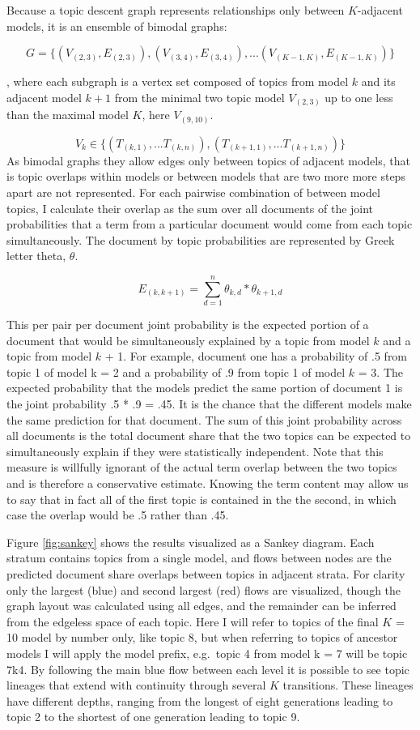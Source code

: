 \documentclass[]{book}
\theoremstyle{definition}
\theoremstyle{definition}
\theoremstyle{definition}
\theoremstyle{remark}
\begin{document}
Because a topic descent graph represents relationships only between
\(K\)-adjacent models, it is an ensemble of bimodal graphs:

\[G=\{(V_{(2,3)},E_{(2,3)}),(V_{(3,4)},E_{(3,4)}),...(V_{(K-1,K)},E_{(K-1,K)})\}\]

, where each subgraph is a vertex set composed of topics from model
\(k\) and its adjacent model \(k + 1\) from the minimal two topic model
\(V_{(2,3)}\) up to one less than the maximal model \(K\), here
\(V_{(9,10)}\).

\[V_k\in\{(T_{(k,1)},...T_{(k,n)}),(T_{(k+1,1)},...T_{(k+1,n)})\}\] As
bimodal graphs they allow edges only between topics of adjacent models,
that is topic overlaps within models or between models that are two more
more steps apart are not represented. For each pairwise combination of
between model topics, I calculate their overlap as the sum over all
documents of the joint probabilities that a term from a particular
document would come from each topic simultaneously. The document by
topic probabilities are represented by Greek letter theta, \(\theta\).

\[E_{(k,k+1)}={\sum^n_{d=1}\theta_{k,d}*\theta_{k+1,d}}\]

This per pair per document joint probability is the expected portion of
a document that would be simultaneously explained by a topic from model
\(k\) and a topic from model \(k\) + 1. For example, document one has a
probability of .5 from topic 1 of model k = 2 and a probability of .9
from topic 1 of model \(k\) = 3. The expected probability that the
models predict the same portion of document 1 is the joint probability
.5 * .9 = .45. It is the chance that the different models make the same
prediction for that document. The sum of this joint probability across
all documents is the total document share that the two topics can be
expected to simultaneously explain if they were statistically
independent. Note that this measure is willfully ignorant of the actual
term overlap between the two topics and is therefore a conservative
estimate. Knowing the term content may allow us to say that in fact all
of the first topic is contained in the the second, in which case the
overlap would be .5 rather than .45.

Figure \ref{fig:sankey} shows the results visualized as a Sankey
diagram. Each stratum contains topics from a single model, and flows
between nodes are the predicted document share overlaps between topics
in adjacent strata. For clarity only the largest (blue) and second
largest (red) flows are visualized, though the graph layout was
calculated using all edges, and the remainder can be inferred from the
edgeless space of each topic. Here I will refer to topics of the final
\(K\) = 10 model by number only, like topic 8, but when referring to
topics of ancestor models I will apply the model prefix, e.g.~topic 4
from model k = 7 will be topic 7k4. By following the main blue flow
between each level it is possible to see topic lineages that extend with
continuity through several \(K\) transitions. These lineages have
different depths, ranging from the longest of eight generations leading
to topic 2 to the shortest of one generation leading to topic 9.
\end{document}
